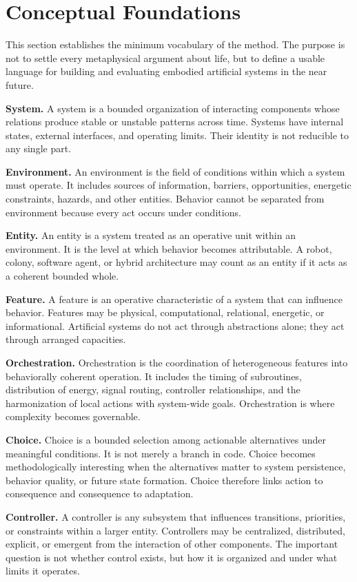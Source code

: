 \documentclass[a4paper,english]{article}
\begin{document}
\section{Conceptual Foundations}

This section establishes the minimum vocabulary of the method. The
purpose is not to settle every metaphysical argument about life, but
to define a usable language for building and evaluating embodied artificial
systems in the near future.

\textbf{System.} A system is a bounded organization of interacting components whose
relations produce stable or unstable patterns across time. Systems
have internal states, external interfaces, and operating limits.
Their identity is not reducible to any single part.

\textbf{Environment.} An environment is the field of conditions within which a system must
operate. It includes sources of information, barriers, opportunities,
energetic constraints, hazards, and other entities. Behavior cannot
be separated from environment because every act occurs under conditions.

\textbf{Entity.} An entity is a system treated as an operative unit within an environment.
It is the level at which behavior becomes attributable. A robot, colony,
software agent, or hybrid architecture may count as an entity if
it acts as a coherent bounded whole.

\textbf{Feature.} A feature is an operative characteristic of a system that can influence
behavior. Features may be physical, computational, relational, energetic,
or informational. Artificial systems do not act through abstractions
alone; they act through arranged capacities.

\textbf{Orchestration.} Orchestration is the coordination of heterogeneous features into behaviorally
coherent operation. It includes the timing of subroutines, distribution
of energy, signal routing, controller relationships, and the harmonization
of local actions with system-wide goals. Orchestration is where complexity
becomes governable.

\textbf{Choice.} Choice is a bounded selection among actionable alternatives under
meaningful conditions. It is not merely a branch in code. Choice becomes
methodologically interesting when the alternatives matter to system
persistence, behavior quality, or future state formation. Choice therefore
links action to consequence and consequence to adaptation.

\textbf{Controller.} A controller is any subsystem that influences transitions, priorities,
or constraints within a larger entity. Controllers may be centralized,
distributed, explicit, or emergent from the interaction of other components.
The important question is not whether control exists, but how it is
organized and under what limits it operates.
\end{document}
